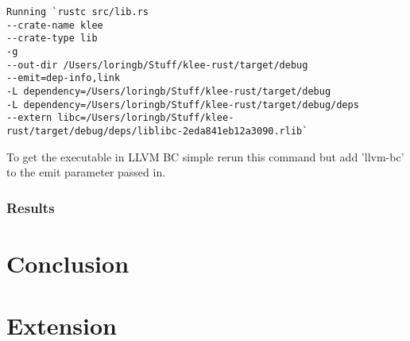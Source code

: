 \documentclass{report}
\begin{document}
\begin{lstlisting}
Running `rustc src/lib.rs 
--crate-name klee 
--crate-type lib 
-g
--out-dir /Users/loringb/Stuff/klee-rust/target/debug 
--emit=dep-info,link
-L dependency=/Users/loringb/Stuff/klee-rust/target/debug 
-L dependency=/Users/loringb/Stuff/klee-rust/target/debug/deps 
--extern libc=/Users/loringb/Stuff/klee-rust/target/debug/deps/liblibc-2eda841eb12a3090.rlib`
\end{lstlisting}

To get the executable in LLVM BC simple rerun this command but add 'llvm-bc' to the emit parameter passed in.

\subsection{Results}

\chapter {Conclusion}

\chapter {Extension}
\end{document}

